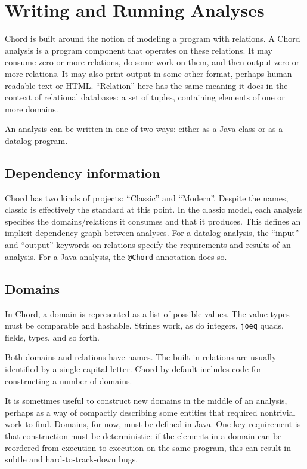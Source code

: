 \chapter{Writing and Running Analyses}
\label{chap:analyses}

Chord is built around the notion of modeling a program with relations.
A Chord analysis is a program component that operates on these relations.
It may consume zero or more relations, do some work on them, and then output zero or more relations.
It may also print output in some other format, perhaps human-readable text or HTML.
``Relation'' here has the same meaning it does in the context of relational databases: a set of tuples, containing elements of one or more domains.  


An analysis can be written in one of two ways: either as a Java class or as a datalog program. 

\section{Dependency information}

Chord has two kinds of projects: ``Classic'' and ``Modern''.  Despite the names, classic is effectively the standard at this point.
In the classic model, each analysis specifies the domains/relations it consumes and that it produces.
This defines an implicit dependency graph between analyses.  For a datalog analysis, the ``input'' and ``output'' keywords on relations specify the requirements and results of an analysis.  For a Java analysis, the \texttt{@Chord} annotation does so. 

\section{Domains}

In Chord, a domain is represented as a list of possible values. 
The value types must be comparable and hashable.
Strings work, as do integers, \texttt{joeq} quads, fields, types, and so forth. 
%

Both domains and relations have names. The built-in relations are usually identified by a single capital letter.
Chord by default includes code for constructing a number of domains.

It is sometimes useful to construct new domains in the middle of an analysis, perhaps as a way of compactly describing some entities that required nontrivial work to find. Domains, for now, must be defined in Java. One key requirement is that construction must be deterministic: if the elements in a domain can be reordered from execution to execution on the same program, this can result in subtle and hard-to-track-down bugs.


